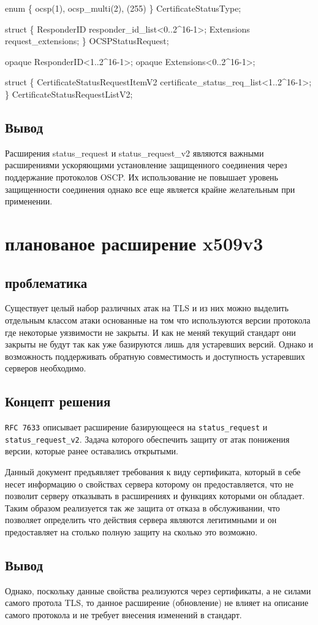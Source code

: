 enum \{ ocsp(1), ocsp\_multi(2), (255) \} CertificateStatusType;

struct \{
ResponderID responder\_id\_list<0..2\^{}16-1>;
Extensions request\_extensions;
\} OCSPStatusRequest;

opaque ResponderID<1..2\^{}16-1>;
opaque Extensions<0..2\^{}16-1>;

struct \{
CertificateStatusRequestItemV2
certificate\_status\_req\_list<1..2\^{}16-1>;
\} CertificateStatusRequestListV2;

\subsection{Вывод}
Расширения status\_request и status\_request\_v2 являются важными расширениями ускоряющими установление защищенного соединения через поддержание протоколов OSCP. Их использование не повышает уровень защищенности соединения однако все еще является крайне желательным при применении. 

\section{планованое расширение x509v3}

\subsection{проблематика}
Существует целый набор различных атак на TLS и из них можно выделить отдельным классом атаки основанные на том что используются версии протокола где некоторые уязвимости не закрыты. И как не меняй текущий стандарт они закрыты не будут так как уже базируются лишь для устаревших версий. Однако и возможность поддерживать обратную совместимость и доступность устаревших серверов необходимо.

\subsection{Концепт решения}
\texttt{RFC 7633} описывает расширение базирующееся на \texttt{status\_request} и \texttt{status\_request\_v2}. Задача которого обеспечить защиту от атак понижения версии, которые ранее оставались открытыми. 

Данный документ предъявляет требования к виду сертификата, который в себе несет информацию о свойствах сервера которому он предоставляется, что не позволит серверу отказывать в расширениях и функциях которыми он обладает. Таким образом реализуется так же защита от отказа в обслуживании, что позволяет определить что действия сервера являются легитимными и он предоставляет на столько полную защиту на сколько это возможно. 

\subsection{Вывод}
Однако, поскольку данные свойства реализуются через сертификаты, а не силами самого протола TLS, то данное расширение (обновление) не влияет на описание самого протокола и не требует внесения изменений в стандарт.
